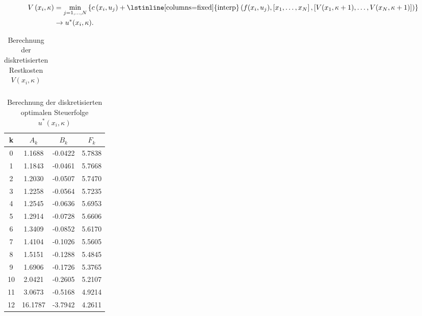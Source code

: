 \begin{align*}
	V\left(x_i,\kappa \right) & = \min\limits_{j=1,\ldots,N}\left\{c\left(x_i,u_j \right) + \text{\lstinline[columns=fixed]{interp}}\left(f(x_i,u_j), 
	\left[x_1,\ldots,x_N \right],\left[V(x_1,\kappa+1),\ldots,V(x_N,\kappa+1) \right] \right) \right\}\\
	& \rightarrow u^{\ast}(x_i,\kappa).
\end{align*}
\begin{table}[htb]
\caption{Berechnung der diskretisierten Restkosten $V(x_i,\kappa)$}
\centering
\begin{tabular}{c|cccc}
	\hline
	
\end{tabular}
\label{tab:kap_3_dyn_prog_restkosten}
\end{table}
\begin{table}[htb]
\caption{Berechnung der diskretisierten optimalen Steuerfolge $u^{\ast}(x_i,\kappa)$}
\centering
\begin{tabular}{c|ccc}
	\hline
	k 	& $A_k$		& $B_k$		& $F_k$	\\\hline
	0	& 1.1688	& -0.0422	& 5.7838\\
	1	& 1.1843	& -0.0461	& 5.7668\\
	2	& 1.2030	& -0.0507	& 5.7470\\
	3	& 1.2258	& -0.0564	& 5.7235\\
	4	& 1.2545	& -0.0636	& 5.6953\\
	5	& 1.2914	& -0.0728	& 5.6606\\
	6	& 1.3409	& -0.0852	& 5.6170\\
	7	& 1.4104	& -0.1026	& 5.5605\\
	8	& 1.5151	& -0.1288	& 5.4845\\
	9	& 1.6906	& -0.1726	& 5.3765\\
	10	& 2.0421	& -0.2605	& 5.2107\\
	11	& 3.0673	& -0.5168	& 4.9214\\
	12	& 16.1787	& -3.7942	& 4.2611\\\hline
\end{tabular}
\label{tab:kap_3_dyn_prog_optu}
\end{table}

